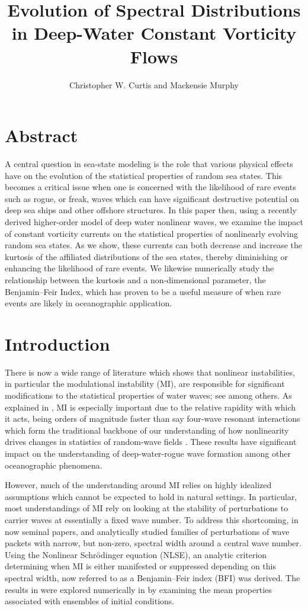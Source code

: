 \documentclass[a4paper,11pt]{article}
\title{Evolution of Spectral Distributions in Deep-Water Constant Vorticity Flows}
\author{Christopher W. Curtis and Mackensie Murphy}
\date{}
\begin{document}
\maketitle
\section*{Abstract}
A central question in sea-state modeling is the role that various physical effects have on the evolution of the statistical properties of random sea states.  This becomes a critical issue when one is concerned with the likelihood of rare events such as rogue, or freak, waves which can have significant destructive potential on deep sea ships and other offshore structures.  In this paper then, using a recently derived higher-order model of deep water nonlinear waves, we examine the impact of constant vorticity currents on the statistical properties of nonlinearly evolving random sea states.  As we show, these currents can both decrease and increase the kurtosis of the affiliated distributions of the sea states, thereby diminishing or enhancing the likelihood of rare events.   We likewise numerically study the relationship between the kurtosis and a non-dimensional parameter, the Benjamin--Feir Index, which has proven to be a useful measure of when rare events are likely in oceanographic application.  

\section{Introduction}
There is now a wide range of literature which shows that nonlinear instabilities, in particular the modulational instability (MI), are responsible for significant modifications to the statistical properties of water waves; see \cite{dysthe2,dysthe3,onorato,thomas2012nonlinear} among others.   As explained in \cite{janssen}, MI is especially important due to the relative rapidity with which it acts, being orders of magnitude faster than say four-wave resonant interactions which form the traditional backbone of our understanding of how nonlinearity drives changes in statistics of random-wave fields \cite{hasselmann,holthuijsen}.  These results have significant impact on the understanding of deep-water-rogue wave formation among other oceanographic phenomena.  

However, much of the understanding around MI relies on highly idealized assumptions which cannot be expected to hold in natural settings.  In particular, most understandings of MI rely on looking at the stability of perturbations to carrier waves at essentially a fixed wave number.  To address this shortcoming, in now seminal papers, \cite{alber} and \cite{alber2} analytically studied families of perturbations of wave packets with narrow, but non-zero, spectral width around a central wave number.  Using the Nonlinear Schr\"{o}dinger equation (NLSE), an analytic criterion determining when MI is either manifested or suppressed depending on this spectral width, now referred to as a Benjamin--Feir index (BFI) was derived.  The results in \cite{alber} were explored numerically in \cite{dysthe2,dysthe3} by examining the mean properties associated with ensembles of initial conditions.  
\end{document}
